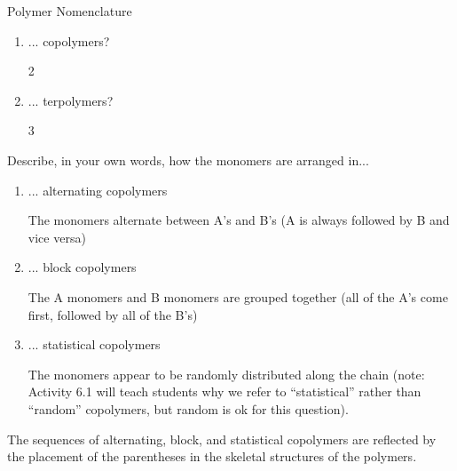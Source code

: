 \begin{activity}{Polymer Nomenclature}
\begin{ctqs}
\begin{enumerate}
			\item ... copolymers?
			
				\begin{solution}[0.25in]{}
				2
				\end{solution}
			
			\item ... terpolymers?
			
				\begin{solution}[0.25in]{}
				3
				\end{solution}
			
		\end{enumerate}

	\question Describe, in your own words, how the monomers are arranged in...
	
		\begin{enumerate}
			
			\item ... alternating copolymers
			
				\begin{solution}[0.25in]{}
				The monomers alternate between A's and B's (A is always followed by B and vice versa)
				\end{solution}
			
			\item ... block copolymers
			
				\begin{solution}[0.25in]{}
				The A monomers and B monomers are grouped together (all of the A's come first, followed by all of the B's)
				\end{solution}
				
			\item ... statistical copolymers
			
				\begin{solution}[0.25in]{}
				The monomers appear to be randomly distributed along the chain (note: Activity 6.1 will teach students why we refer to ``statistical'' rather than ``random'' copolymers, but random is ok for this question).
				\end{solution}
				
		\end{enumerate}
		
	\item The sequences of alternating, block, and statistical copolymers are reflected by the placement of the parentheses in the skeletal structures of the polymers.
	
		\begin{enumerate}
		

\end{enumerate}
\end{ctqs}
\end{activity}
